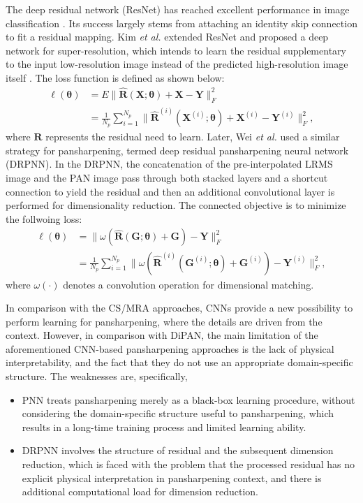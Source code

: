 \documentclass[journal]{IEEEtran}
\begin{document}
The deep residual network (ResNet) has reached excellent performance in image classification \cite{Resnet:He2015}. Its success largely stems from attaching an identity skip connection to fit a residual mapping. Kim \emph{et al.} extended ResNet and proposed a deep network for super-resolution, which intends to learn the residual supplementary to the input low-resolution image instead of the predicted high-resolution image itself \cite{SuperRes-CNN:Kim2016}. The loss function is defined as shown below:
\begin{equation}
\label{eq:lossvdsr}
\begin{split}
\ell(\pmb{\theta})  &= E \|\widehat{\mathbf{R}}(\mathbf{X};\pmb{\theta}) + \mathbf{X} - \mathbf{Y}\|^2_F\\
&= \frac{1}{N_p} \sum_{i=1}^{N_p} \|\widehat{\mathbf{R}}^{(i)}(\mathbf{X}^{(i)};\pmb{\theta}) + \mathbf{X}^{(i)} - \mathbf{Y}^{(i)}\|^2_F,
\end{split}
\end{equation}
where $\mathbf{R}$ represents the residual need to learn. Later, Wei \emph{et al.} used a similar strategy for pansharpening, termed deep residual pansharpening neural network (DRPNN)\cite{Wei2017Boosting}. In the DRPNN, the concatenation of the pre-interpolated LRMS image and the PAN image pass through both stacked layers and a shortcut connection to yield the residual and then an additional convolutional layer is performed for dimensionality reduction. The connected objective is to minimize the follwoing loss:
\begin{equation}
\label{eq:DRPNN}
\begin{split}
\ell(\pmb{\theta})  &= \|{\omega}(\widehat{\mathbf{R}}(\mathbf{G};\pmb{\theta}) + \mathbf{G}) - {\mathbf{Y}}\|^2_F\\
&= \frac{1}{N_p} \sum_{i=1}^{N_p} \|{\omega}(\widehat{\mathbf{R}}^{(i)}(\mathbf{G}^{(i)};\pmb{\theta}) + \mathbf{G}^{(i)}) - {\mathbf{Y}^{(i)}}\|^2_F,
\end{split}
\end{equation}
where ${\omega}(\cdot)$ denotes a convolution operation for dimensional matching.

In comparison with the CS/MRA approaches, CNNs provide a new possibility to perform learning for pansharpening, where the details are driven from the context. However, in comparison with DiPAN, the main limitation of the aforementioned CNN-based pansharpening approaches is the lack of physical interpretability, and the fact that they do not use an appropriate domain-specific structure. The weaknesses are, specifically,
\begin{itemize}
\item PNN treats pansharpening merely as a black-box learning procedure, without considering the domain-specific structure useful to pansharpening, which results in a long-time training process and limited learning ability.
\item DRPNN involves the structure of residual and the subsequent dimension reduction, which is faced with the problem that the processed residual has no explicit physical interpretation in pansharpening context, and there is additional computational load for dimension reduction.
\end{itemize}
\end{document}
